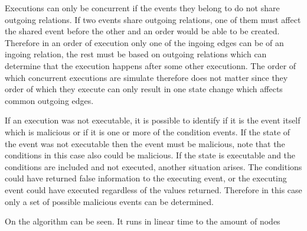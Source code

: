     Executions can only be concurrent if the events they belong to do not share outgoing relations. If two events share outgoing relations, one of them must affect the shared event before the other and an order would be able to be created. Therefore in an order of execution only one of the ingoing edges can be of an ingoing relation, the rest must be based on outgoing relations which can determine that the execution happens after some other executionn. The order of which concurrent executions are simulate therefore does not matter since they order of which they execute can only result in one state change which affects common outgoing edges.
    
    \newpar If an execution was not executable, it is possible to identify if it is the event itself which is malicious or if it is one or more of the condition events. If the state of the event was not executable then the event must be malicious, note that the conditions in this case also could be malicious. If the state is executable and the conditions are included and not executed, another situation arises. The conditions could have returned false information to the executing event, or the executing event could have executed regardless of the values returned. Therefore in this case only a set of possible malicious events can be determined.

	\newpar On  the algorithm can be seen. It runs in linear time to the amount of nodes
	
	
